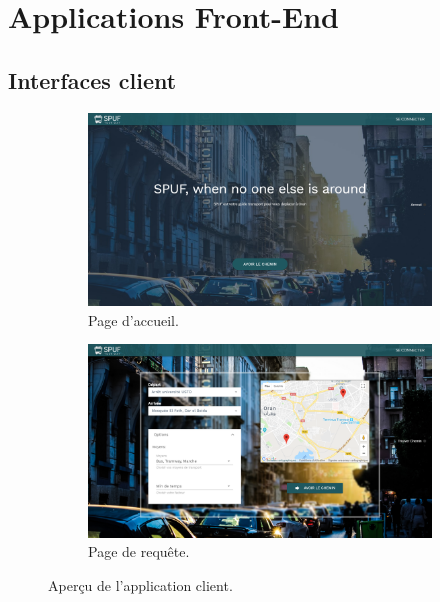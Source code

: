 \section{Applications Front-End}
\label{ref:Implementation}
\subsection{Interfaces client}
\begin{figure}[h!]

	 \begin{subfigure}[b]{\linewidth}
	 	\includegraphics[width=\linewidth]{img/spuf/acceuil.png}
	 	\caption{Page d'accueil.}
	 \end{subfigure}
	 
	 \begin{subfigure}[b]{\linewidth}
	 	\includegraphics[width=\linewidth]{img/spuf/request.png}
	 	\caption{Page de requête.}	 
	 \end{subfigure}
	 
	\caption{Aperçu de l'application client.}

\end{figure}


